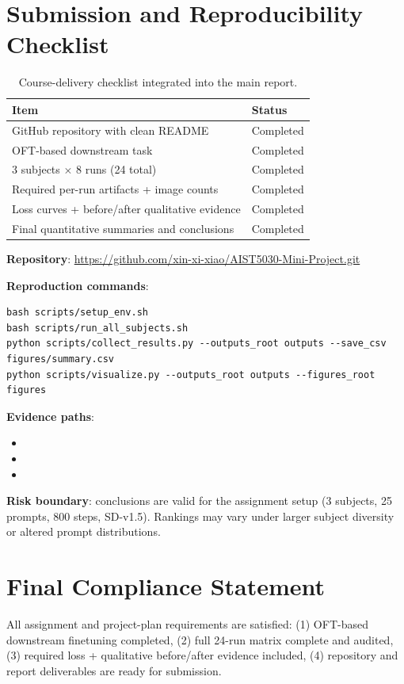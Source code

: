 \documentclass[10pt,twocolumn]{article}
\begin{document}
\section{Submission and Reproducibility Checklist}
\begin{table}[t]
\centering
\caption{Course-delivery checklist integrated into the main report.}
\begin{tabular}{@{}p{}p{}@{}}
\toprule
Item & Status \\
\midrule
GitHub repository with clean README & Completed \\
OFT-based downstream task & Completed \\
3 subjects $\times$ 8 runs (24 total) & Completed \\
Required per-run artifacts + image counts & Completed \\
Loss curves + before/after qualitative evidence & Completed \\
Final quantitative summaries and conclusions & Completed \\
\bottomrule
\end{tabular}
\end{table}

\textbf{Repository}: \url{https://github.com/xin-xi-xiao/AIST5030-Mini-Project.git}

\textbf{Reproduction commands}:\newline
\begin{lstlisting}[style=compact]
bash scripts/setup_env.sh
bash scripts/run_all_subjects.sh
python scripts/collect_results.py --outputs_root outputs --save_csv figures/summary.csv
python scripts/visualize.py --outputs_root outputs --figures_root figures
\end{lstlisting}

\textbf{Evidence paths}:
\begin{itemize}
\item {}
\item {}
\item {}
\end{itemize}

\textbf{Risk boundary}: conclusions are valid for the assignment setup
(3 subjects, 25 prompts, 800 steps, SD-v1.5). Rankings may vary under larger
subject diversity or altered prompt distributions.

\section{Final Compliance Statement}
All assignment and project-plan requirements are satisfied:
(1) OFT-based downstream finetuning completed,
(2) full 24-run matrix complete and audited,
(3) required loss + qualitative before/after evidence included,
(4) repository and report deliverables are ready for submission.
\end{document}
